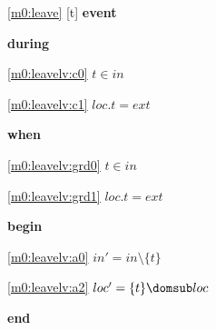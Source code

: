 \noindent \ref{m0:leave} [t] \textbf{event}
\begin{block}
\item \textbf{during}
\begin{block}
\item[ \eqref{m0:leavelv:c0} ]$t \in in $ %
\item[ \eqref{m0:leavelv:c1} ]$loc.t = ext $ %
\end{block}
\item \textbf{when}
\begin{block}
\item[ \eqref{m0:leavelv:grd0} ]$t \in in $ %
\item[ \eqref{m0:leavelv:grd1} ]$loc.t = ext $ %
\end{block}
\item \textbf{begin}
\begin{block}
\item[ \eqref{m0:leavelv:a0} ]$in' = in \setminus \{ t \} $ %
\item[ \eqref{m0:leavelv:a2} ]$loc' = \{ t \} \domsub loc $ %
\end{block}
\item \textbf{end} \\
\end{block}
